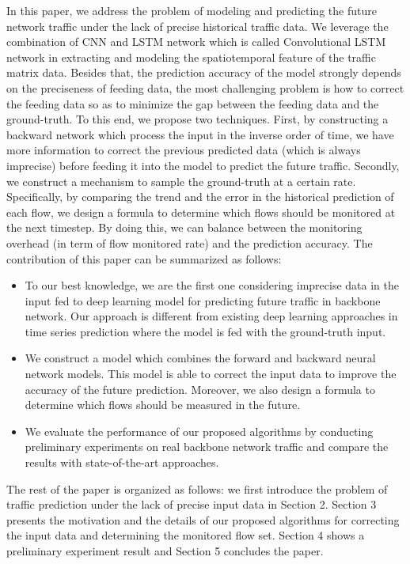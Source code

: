 In this paper, we address the problem of modeling and predicting the future network traffic under the lack of precise historical traffic data. We leverage the combination of CNN and LSTM network which is called Convolutional LSTM network \cite{ref:xingjian2015convolutional} in extracting and modeling the spatiotemporal feature of the traffic matrix data. Besides that, the prediction accuracy of the model strongly depends on the preciseness of feeding data, the most challenging problem is how to correct the feeding data so as to minimize the gap between the feeding data and the ground-truth. To this end, we propose two techniques. First, by constructing a backward network which process the input in the inverse order of time, we have more information to correct the previous predicted data (which is always imprecise) before feeding it into the model to predict the future traffic. Secondly, we construct a mechanism to sample the ground-truth at a certain rate. Specifically, by comparing the trend and the error in the historical prediction of each flow, we design a formula to determine which flows should be monitored at the next timestep. By doing this, we can balance between the monitoring overhead (in term of flow monitored rate) and the prediction accuracy. The contribution of this paper can be summarized as follows:
\begin{itemize}
\item To our best knowledge, we are the first one considering imprecise data in the input fed to deep learning model for predicting future traffic in backbone network. Our approach is different from existing deep learning approaches in time series prediction where the model is fed with the ground-truth input.
\item We construct a model which combines the forward and backward neural network models. This model is able to correct the input data to improve the accuracy of the future prediction. Moreover, we also design a formula to determine which flows should be measured in the future.
\item We evaluate the performance of our proposed algorithms by conducting preliminary experiments on real backbone network traffic and compare the results with state-of-the-art approaches.
\end{itemize}
The rest of the paper is organized as follows: we first introduce the problem of traffic prediction under the lack of precise input data in Section 2. Section 3 presents the motivation and the details of our proposed algorithms for correcting the input data and determining the monitored flow set. Section 4 shows a preliminary experiment result and Section 5 concludes the paper.
